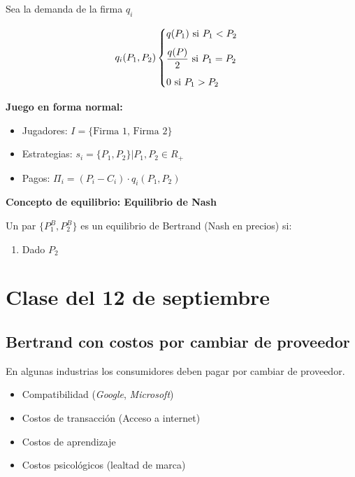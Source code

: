\documentclass[letterpaper,12pt,twocolumn]{report}
\begin{document}
Sea la demanda de la firma $q_i$

$$ q_i(P_1,P_2) \begin{cases}
	
	q(P_1) \text{ si } P_1<P_2 	\vspace{.25cm}  \\
	
\vspace{.25cm}	\dfrac{q(P)}{2} \text{ si } P_1=P_2 \\

	0 \text{ si } P_1>P_2	
\end{cases}$$

\textbf{Juego en forma normal:}

\begin{itemize}
	\item Jugadores: $I= \{ \text{Firma 1, Firma 2} \}$
	\item Estrategias: $s_i=\{ P_1,P_2 \} | P_1,P_2\in R_{+}$
	\item Pagos: $\Pi_i=(P_i-C_i)\cdot q_i(P_1,P_2)$
\end{itemize}

\textbf{Concepto de equilibrio: Equilibrio de Nash}

Un par $ \{ P_1^B, P_2^B \} $ es un equilibrio de Bertrand (Nash en precios) si:

\begin{enumerate}
	\item  Dado $P_2$
\end{enumerate}


\section{Clase del 12 de septiembre}

\subsection*{Bertrand con costos por cambiar de proveedor}

En algunas industrias los consumidores deben pagar por cambiar de proveedor. 

\begin{itemize}
	\item Compatibilidad (\textit{Google}, \textit{Microsoft})
	\item Costos de transacción (Acceso a internet)
	\item  Costos de aprendizaje
	\item Costos psicológicos (lealtad de marca)
\end{itemize}
\end{document}
